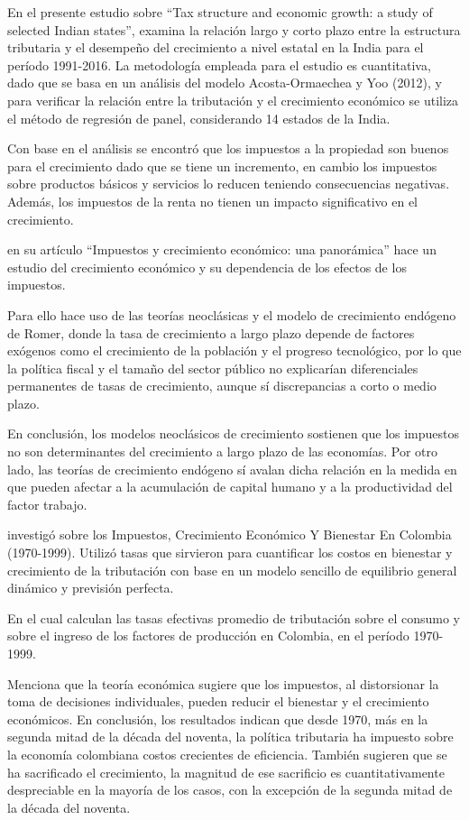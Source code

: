 \documentclass[
  letterpaper,
  DIV=11,
  numbers=noendperiod]{scrartcl}
\begin{document}
\textcite{neog_tax_2020} En el presente estudio sobre ``Tax structure
and economic growth: a study of selected Indian states'', examina la
relación largo y corto plazo entre la estructura tributaria y el
desempeño del crecimiento a nivel estatal en la India para el período
1991-2016. La metodología empleada para el estudio es cuantitativa, dado
que se basa en un análisis del modelo Acosta-Ormaechea y Yoo (2012), y
para verificar la relación entre la tributación y el crecimiento
económico se utiliza el método de regresión de panel, considerando 14
estados de la India.

Con base en el análisis se encontró que los impuestos a la propiedad son
buenos para el crecimiento dado que se tiene un incremento, en cambio
los impuestos sobre productos básicos y servicios lo reducen teniendo
consecuencias negativas. Además, los impuestos de la renta no tienen un
impacto significativo en el crecimiento.

\textcite{rivero_impuestos_2008} en su artículo ``Impuestos y
crecimiento económico: una panorámica'' hace un estudio del crecimiento
económico y su dependencia de los efectos de los impuestos.

Para ello hace uso de las teorías neoclásicas y el modelo de crecimiento
endógeno de Romer, donde la tasa de crecimiento a largo plazo depende de
factores exógenos como el crecimiento de la población y el progreso
tecnológico, por lo que la política fiscal y el tamaño del sector
público no explicarían diferenciales permanentes de tasas de
crecimiento, aunque sí discrepancias a corto o medio plazo.

En conclusión, los modelos neoclásicos de crecimiento sostienen que los
impuestos no son determinantes del crecimiento a largo plazo de las
economías. Por otro lado, las teorías de crecimiento endógeno sí avalan
dicha relación en la medida en que pueden afectar a la acumulación de
capital humano y a la productividad del factor trabajo.

\textcite{fergusson_impuestos_2003} investigó sobre los Impuestos,
Crecimiento Económico Y Bienestar En Colombia (1970-1999). Utilizó tasas
que sirvieron para cuantificar los costos en bienestar y crecimiento de
la tributación con base en un modelo sencillo de equilibrio general
dinámico y previsión perfecta.

En el cual calculan las tasas efectivas promedio de tributación sobre el
consumo y sobre el ingreso de los factores de producción en Colombia, en
el período 1970-1999.

Menciona que la teoría económica sugiere que los impuestos, al
distorsionar la toma de decisiones individuales, pueden reducir el
bienestar y el crecimiento económicos. En conclusión, los resultados
indican que desde 1970, más en la segunda mitad de la década del
noventa, la política tributaria ha impuesto sobre la economía colombiana
costos crecientes de eficiencia. También sugieren que se ha sacrificado
el crecimiento, la magnitud de ese sacrificio es cuantitativamente
despreciable en la mayoría de los casos, con la excepción de la segunda
mitad de la década del noventa.
\end{document}
